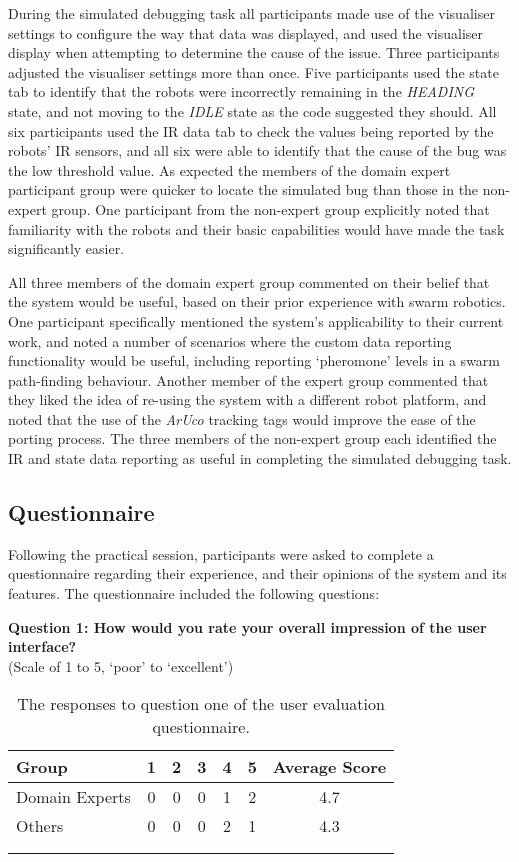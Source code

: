 During the simulated debugging task all participants made use of the visualiser settings to configure the way that data was displayed, and used the visualiser display when attempting to determine the cause of the issue. Three participants adjusted the visualiser settings more than once. Five participants used the state tab to identify that the robots were incorrectly remaining in the \textit{HEADING} state, and not moving to the \textit{IDLE} state as the code suggested they should. All six participants used the IR data tab to check the values being reported by the robots' IR sensors, and all six were able to identify that the cause of the bug was the low threshold value. As expected the members of the domain expert participant group were quicker to locate the simulated bug than those in the non-expert group. One participant from the non-expert group explicitly noted that familiarity with the robots and their basic capabilities would have made the task significantly easier.

All three members of the domain expert group commented on their belief that the system would be useful, based on their prior experience with swarm robotics. One participant specifically mentioned the system's applicability to their current work, and noted a number of scenarios where the custom data reporting functionality would be useful, including reporting `pheromone' levels in a swarm path-finding behaviour. Another member of the expert group commented that they liked the idea of re-using the system with a different robot platform, and noted that the use of the \textit{ArUco} tracking tags would improve the ease of the porting process. The three members of the non-expert group each identified the IR and state data reporting as useful in completing the simulated debugging task.

\subsection{Questionnaire} \label{UserEvaluationQuestionnaire}
Following the practical session, participants were asked to complete a questionnaire regarding their experience, and their opinions of the system and its features. The questionnaire included the following questions:

\noindent\textbf{Question 1: How would you rate your overall impression of the user interface?}\\(Scale of 1 to 5, `poor' to `excellent')

\begin{longtable}{ l c c c c c c }
 \textbf{Group} & \textbf{1} & \textbf{2} & \textbf{3} & \textbf{4} & \textbf{5} & \textbf{Average Score} \\ 
 \hline
 Domain Experts & 0 & 0 & 0 & 1 & 2 & 4.7 \\
 Others 		& 0 & 0 & 0 & 2 & 1 & 4.3 \\
 \bottomrule
\caption[User Evaluation Question 1 Responses]{The responses to question one of the user evaluation questionnaire.}\\
\label{tab:EvaluationQuestionOne}
\end{longtable}

